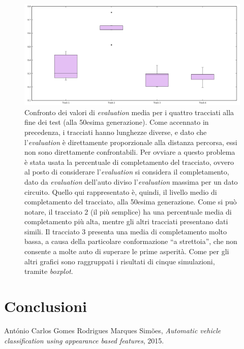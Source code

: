\documentclass[a4paper,12pt]{article}
\begin{document}
\begin{figure}[H]
	\centering
	\includegraphics[width=130mm]{../results/avgEvAtTheEnd.png}
	\caption{Confronto dei valori di \emph{evaluation} media per i quattro tracciati alla fine dei test (alla 50esima generazione). Come accennato in precedenza, i tracciati hanno lunghezze diverse, e dato che l'\emph{evaluation} è direttamente proporzionale alla distanza percorsa, essi non sono direttamente confrontabili. Per ovviare a questo problema è stata usata la percentuale di completamento del tracciato, ovvero al posto di considerare l'\emph{evaluation} si considera il completamento, dato da \emph{evaluation} dell'auto diviso l'\emph{evaluation} massima per un dato circuito. Quello qui rappresentato è, quindi, il livello medio di completamento del tracciato, alla 50esima generazione. Come si può notare, il tracciato 2 (il più semplice) ha una percentuale media di completamento più alta, mentre gli altri tracciati presentano dati simili. Il tracciato 3 presenta una media di completamento molto bassa, a causa della particolare conformazione ``a strettoia'', che non consente a molte auto di superare le prime asperità. Come per gli altri grafici sono raggruppati i risultati di cinque simulazioni, tramite \emph{boxplot}.}
\end{figure}


\section{Conclusioni}

\newpage
\begin{thebibliography}{1}
	
	
	 António Carlos Gomes Rodrigues Marques Simões, {\em Automatic vehicle classification using appearance based features}, 2015.
	
\end{thebibliography}
\end{document}

